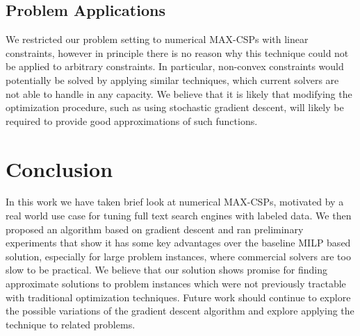 \documentclass[a4paper]{article}
\begin{document}
\subsection{Problem Applications}

We restricted our problem setting to numerical MAX-CSPs with linear
constraints, however in principle there is no reason why this technique could
not be applied to arbitrary constraints. In particular, non-convex constraints
would potentially be solved by applying similar techniques, which current
solvers are not able to handle in any capacity. We believe that it is likely
that modifying the optimization procedure, such as using stochastic gradient
descent, will likely be required to provide good approximations of such
functions.

\section{Conclusion}

In this work we have taken brief look at numerical MAX-CSPs, motivated by a
real world use case for tuning full text search engines with labeled data. We
then proposed an algorithm based on gradient descent and ran preliminary
experiments that show it has some key advantages over the baseline MILP based
solution, especially for large problem instances, where commercial solvers are
too slow to be practical. We believe that our solution shows promise for
finding approximate solutions to problem instances which were not previously
tractable with traditional optimization techniques. Future work should continue
to explore the possible variations of the gradient descent algorithm and
explore applying the technique to related problems. 



\end{document}
